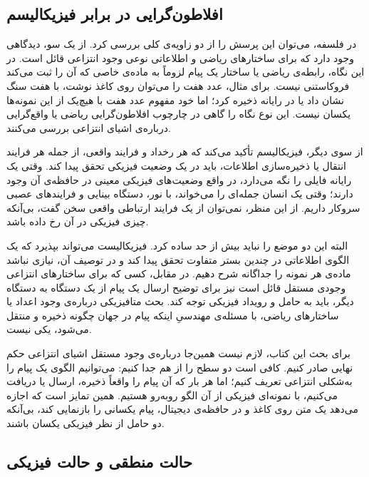 \subsection{افلاطون‌گرایی در برابر فیزیکالیسم}
\label{sub:platonism-vs-physicalism}

در فلسفه، می‌توان این پرسش را از دو زاویه‌ی کلی بررسی کرد. از یک سو، دیدگاهی وجود دارد که برای ساختارهای ریاضی و اطلاعاتی نوعی وجود انتزاعی قائل است. در این نگاه، رابطه‌ی ریاضی یا ساختار یک پیام لزوماً به ماده‌ی خاصی که آن را ثبت می‌کند فروکاستنی نیست. برای مثال، عدد هفت را می‌توان روی کاغذ نوشت، با هفت سنگ نشان داد یا در رایانه ذخیره کرد؛ اما خود مفهوم عدد هفت با هیچ‌یک از این نمونه‌ها یکسان نیست. این نوع نگاه را گاهی در چارچوب افلاطون‌گرایی ریاضی یا واقع‌گرایی درباره‌ی اشیای انتزاعی بررسی می‌کنند.

از سوی دیگر، فیزیکالیسم تأکید می‌کند که هر رخداد و فرایند واقعی، از جمله هر فرایند انتقال یا ذخیره‌سازی اطلاعات، باید در یک وضعیت فیزیکی تحقق پیدا کند. وقتی یک رایانه فایلی را نگه می‌دارد، در واقع وضعیت‌های فیزیکی معینی در حافظه‌ی آن وجود دارند؛ وقتی یک انسان جمله‌ای را می‌خواند، با نور، دستگاه بینایی و فرایندهای عصبی سروکار داریم. از این منظر، نمی‌توان از یک فرایند ارتباطی واقعی سخن گفت، بی‌آنکه چیزی فیزیکی در آن رخ داده باشد.

البته این دو موضع را نباید بیش از حد ساده کرد. فیزیکالیست می‌تواند بپذیرد که یک الگوی اطلاعاتی در چندین بستر متفاوت تحقق پیدا کند و در توصیف آن، نیازی نباشد ماده‌ی هر نمونه را جداگانه شرح دهیم. در مقابل، کسی که برای ساختارهای انتزاعی وجودی مستقل قائل است نیز برای توضیح ارسال یک پیام از یک دستگاه به دستگاه دیگر، باید به حامل و رویداد فیزیکی توجه کند. بحث متافیزیکی درباره‌ی وجود اعداد یا ساختارهای ریاضی، با مسئله‌ی مهندسیِ اینکه پیام در جهان چگونه ذخیره و منتقل می‌شود، یکی نیست.

برای بحث این کتاب، لازم نیست همین‌جا درباره‌ی وجود مستقل اشیای انتزاعی حکم نهایی صادر کنیم. کافی است دو سطح را از هم جدا کنیم: می‌توانیم الگوی یک پیام را به‌شکلی انتزاعی تعریف کنیم؛ اما هر بار که آن پیام را واقعاً ذخیره، ارسال یا دریافت می‌کنیم، با نمونه‌ای فیزیکی از آن الگو روبه‌رو هستیم. همین تمایز است که اجازه می‌دهد یک متن روی کاغذ و در حافظه‌ی دیجیتال، پیام یکسانی را بازنمایی کند، بی‌آنکه دو حامل از نظر فیزیکی یکسان باشند. \autocite{floridi2010,sep-multiple-realizability}

\subsection{حالت منطقی و حالت فیزیکی}
\label{sub:logical-state-vs-physical-state}

